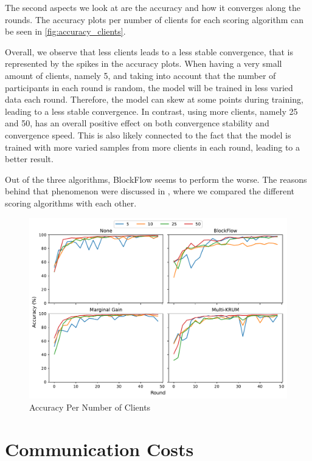 The second aspects we look at are the accuracy and how it converges along the rounds. The accuracy plots per number of clients for each scoring algorithm can be seen in \autoref{fig:accuracy_clients}.

Overall, we observe that less clients leads to a less stable convergence, that is represented by the spikes in the accuracy plots. When having a very small amount of clients, namely 5, and taking into account that the number of participants in each round is random, the model will be trained in less varied data each round. Therefore, the model can skew at some points during training, leading to a less stable convergence. In contrast, using more clients, namely 25 and 50, has an overall positive effect on both convergence stability and convergence speed. This is also likely connected to the fact that the model is trained with more varied samples from more clients in each round, leading to a better result.

Out of the three algorithms, BlockFlow seems to perform the worse. The reasons behind that phenomenon were discussed in , where we compared the different scoring algorithms with each other.

\begin{figure}[!ht]
    \centering
    \includegraphics[width=\textwidth]{graphics/clients/accuracy.pdf}
    \caption{Accuracy Per Number of Clients}
    \label{fig:accuracy_clients}
\end{figure}

\section{Communication Costs}

